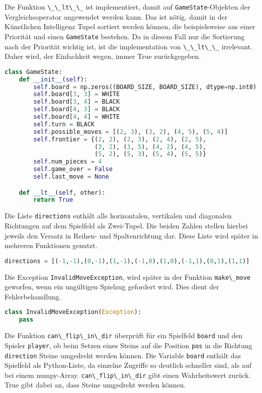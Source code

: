 Die Funktion \passthrough{\lstinline!\_\_lt\_\_!} ist implementiert,
damit auf \passthrough{\lstinline!GameState!}-Objekten der
Vergleichsoperator angewendet werden kann. Das ist nötig, damit in der
Künstlichen Intelligenz Tupel sortiert werden können, die beispielsweise
aus einer Priorität und einen \passthrough{\lstinline!GameState!}
bestehen. Da in diesem Fall nur die Sortierung nach der Priorität
wichtig ist, ist die implementation von
\passthrough{\lstinline!\_\_lt\_\_!} irrelevant. Daher wird, der
Einfachkeit wegen, immer True zurückgegeben.

\begin{lstlisting}[language=Python]
class GameState:
    def __init__(self):
        self.board = np.zeros((BOARD_SIZE, BOARD_SIZE), dtype=np.int8)
        self.board[3, 3] = WHITE
        self.board[3, 4] = BLACK
        self.board[4, 3] = BLACK
        self.board[4, 4] = WHITE
        self.turn = BLACK
        self.possible_moves = [(2, 3), (3, 2), (4, 5), (5, 4)]
        self.frontier = {(2, 2), (2, 3), (2, 4), (2, 5),
                         (3, 2), (3, 5), (4, 2), (4, 5),
                         (5, 2), (5, 3), (5, 4), (5, 5)}
        self.num_pieces = 4
        self.game_over = False
        self.last_move = None

    def __lt__(self, other):
        return True
\end{lstlisting}

Die Liste \passthrough{\lstinline!directions!} enthält alle
horizontalen, vertikalen und diagonalen Richtungen auf dem Spielfeld als
Zwei-Tupel. Die beiden Zahlen stellen hierbei jeweils den Versatz in
Reihen- und Spaltenrichtung dar. Diese Liste wird später in mehreren
Funktionen genutzt.

\begin{lstlisting}[language=Python]
directions = [(-1,-1),(0,-1),(1,-1),(-1,0),(1,0),(-1,1),(0,1),(1,1)]
\end{lstlisting}

Die Exception \passthrough{\lstinline!InvalidMoveException!}, wird
später in der Funktion \passthrough{\lstinline!make\_move!} geworfen,
wenn ein ungültigen Spielzug gefordert wird. Dies dient der
Fehlerbehandlung.

\begin{lstlisting}[language=Python]
class InvalidMoveException(Exception):
    pass
\end{lstlisting}

Die Funktion \passthrough{\lstinline!can\_flip\_in\_dir!} überprüft für
ein Spielfeld \passthrough{\lstinline!board!} und den Spieler
\passthrough{\lstinline!player!}, ob beim Setzen eines Steins auf die
Position \passthrough{\lstinline!pos!} in die Richtung
\passthrough{\lstinline!direction!} Steine umgedreht werden können. Die
Variable \passthrough{\lstinline!board!} enthält das Spielfeld als
Python-Liste, da einzelne Zugriffe so deutlich schneller sind, als auf
bei einem numpy-Array. \passthrough{\lstinline!can\_flip\_in\_dir!} gibt
einen Wahrheitswert zurück. True gibt dabei an, dass Steine umgedreht
werden können.

